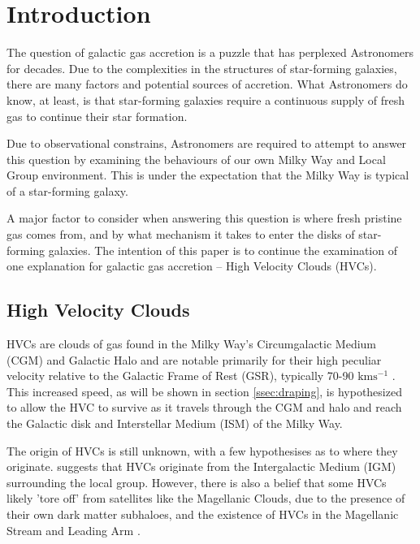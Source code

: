 \chapter{Introduction}
\label{cha:introduction}

The question of galactic gas accretion is a puzzle that has perplexed Astronomers for decades. Due to the complexities in the structures of star-forming galaxies, there are many factors and potential sources of accretion. What Astronomers do know, at least, is that star-forming galaxies require a continuous supply of fresh gas to continue their star formation.


Due to observational constrains, Astronomers are required to attempt to answer this question by examining the behaviours of our own Milky Way and Local Group environment. This is under the expectation that the Milky Way is typical of a star-forming galaxy.


A major factor to consider when answering this question is where fresh pristine gas comes from, and by what mechanism it takes to enter the disks of star-forming galaxies. The intention of this paper is to continue the examination of one explanation for galactic gas accretion – High Velocity Clouds (HVCs). 


\section{High Velocity Clouds}
\label{sec:hvcs}

HVCs are clouds of gas found in the Milky Way's Circumgalactic Medium (CGM) and Galactic Halo and are notable primarily for their high peculiar velocity relative to the Galactic Frame of Rest (GSR), typically 70-90 $\mathrm{km s^{-1}}$ \citep{ID7, ID8, ID66}. This increased speed, as will be shown in section \ref{ssec:draping}, is hypothesized to allow the HVC to survive as it travels through the CGM and halo and reach the Galactic disk and Interstellar Medium (ISM) of the Milky Way.


The origin of HVCs is still unknown, with a few hypothesises as to where they originate. \cite{ID66} suggests that HVCs originate from the Intergalactic Medium (IGM) surrounding the local group. However, there is also a belief that some HVCs likely 'tore off' from satellites like the Magellanic Clouds, due to the presence of their own dark matter subhaloes, and the existence of HVCs in the Magellanic Stream and Leading Arm \cite{ID27, ID2}.


